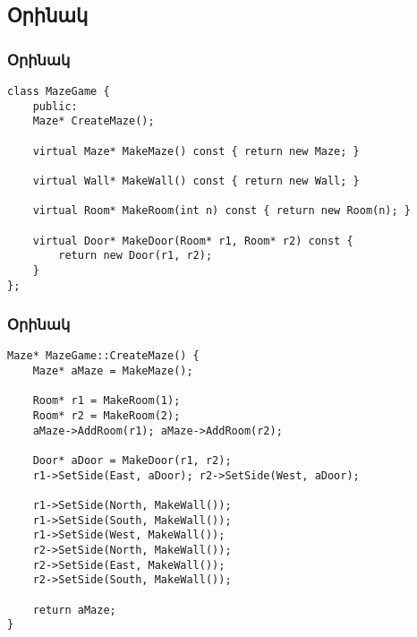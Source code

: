 \documentclass{beamer}
\begin{document}
\subsection{Օրինակ}
\begin{frame}[fragile]\frametitle{Օրինակ}
\begin{english}
\begin{verbatim}
class MazeGame {
    public:
    Maze* CreateMaze();

    virtual Maze* MakeMaze() const { return new Maze; }

    virtual Wall* MakeWall() const { return new Wall; }

    virtual Room* MakeRoom(int n) const { return new Room(n); }

    virtual Door* MakeDoor(Room* r1, Room* r2) const {
        return new Door(r1, r2);
    }
};
\end{verbatim}
\end{english}
\end{frame}

\begin{frame}[fragile]\frametitle{Օրինակ}
\begin{english}
\begin{verbatim}
Maze* MazeGame::CreateMaze() {
    Maze* aMaze = MakeMaze();

    Room* r1 = MakeRoom(1);
    Room* r2 = MakeRoom(2);
    aMaze->AddRoom(r1); aMaze->AddRoom(r2);

    Door* aDoor = MakeDoor(r1, r2);
    r1->SetSide(East, aDoor); r2->SetSide(West, aDoor);

    r1->SetSide(North, MakeWall());
    r1->SetSide(South, MakeWall());
    r1->SetSide(West, MakeWall());
    r2->SetSide(North, MakeWall());
    r2->SetSide(East, MakeWall());
    r2->SetSide(South, MakeWall());

    return aMaze;
}
\end{verbatim}
\end{english}
\end{frame}
\end{document}

